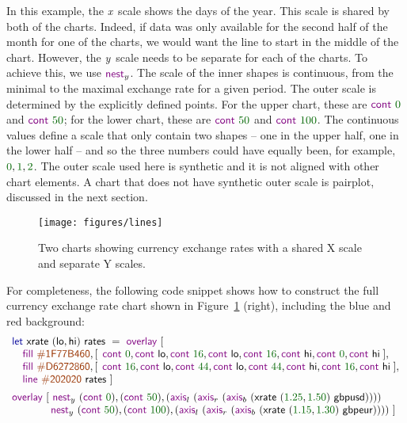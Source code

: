 \documentclass{jfp}
\newcommand{\X}{\emph{x}\ }
\newcommand{\Y}{\emph{y}\ }
\newcommand{\num}[1]{\textcolor{numclr}{#1}}
\newcommand{\strf}[1]{\textnormal{\textcolor{strclr}{\sffamily #1}}}
\newcommand{\ident}[1]{\textnormal{\textcolor{idclr}{\sffamily #1}}}
\newcommand{\kvd}[1]{\textnormal{\textcolor{kvdclr}{\sffamily #1}}}
\newcommand{\fkvd}[1]{\textnormal{\textcolor{fkvdclr}{\sffamily #1}}}
\begin{document}
\vspace{-0.5em}
\noindent
In this example, the \X scale shows the days of the year. This scale is shared by both of the charts.
Indeed, if data was only available for the second half of the month for one of the charts,
we would want the line to start in the middle of the chart. However, the \Y scale needs to be
separate for each of the charts. To achieve this, we use $\kvd{nest}_y$. The scale of the inner
shapes is continuous, from the minimal to the maximal exchange rate for a given period. The
outer scale is determined by the explicitly defined points. For the upper chart, these are
$\kvd{cont}~\num{0}$ and $\kvd{cont}~\num{50}$; for the lower chart, these are
$\kvd{cont}~\num{50}$ and $\kvd{cont}~\num{100}$. The continuous values define a scale that only
contain two shapes -- one in the upper half, one in the lower half -- and so the three numbers could
have equally been, for example, $\num{0},\num{1}, \num{2}$. The outer scale used here is
synthetic and it is not aligned with other chart elements. A chart that does not have synthetic
outer scale is pairplot, discussed in the next section.

\begin{figure}
\texttt{[image: figures/lines]}
\vspace{0.25em}
\caption{Two charts showing currency exchange rates with a shared X scale and separate Y scales.}
\label{fig:lines}
\end{figure}

For completeness, the following code snippet shows how to construct the full currency exchange
rate chart shown in Figure~\ref{fig:lines} (right), including the blue and red background:
%
\begin{equation*}
\begin{array}{l}
\fkvd{let}~\ident{xrate}~(\ident{lo}, \ident{hi})~\ident{rates}~=\kvd{overlay}~[\\
\quad \kvd{fill}~\strf{\#1F77B460}, [\;\,\kvd{cont}~\num{0}, \kvd{cont}~\ident{lo}, \kvd{cont}~\num{16}, \kvd{cont}~\ident{lo}, \kvd{cont}~\num{16}, \kvd{cont}~\ident{hi}, \kvd{cont}~\num{0}, \kvd{cont}~\ident{hi}\;],\\
\quad \kvd{fill}~\strf{\#D6272860}, [\;\,\kvd{cont}~\num{16}, \kvd{cont}~\ident{lo}, \kvd{cont}~\num{44}, \kvd{cont}~\ident{lo}, \kvd{cont}~\num{44}, \kvd{cont}~\ident{hi}, \kvd{cont}~\num{16}, \kvd{cont}~\ident{hi}\;],\\
\quad \kvd{line}~\strf{\#202020}~\ident{rates}~]\\[0.5em]
\kvd{overlay}~[~
\kvd{nest}_y~(\kvd{cont}~\num{0}),(\kvd{cont}~\num{50}), (\kvd{axis}_l~(\kvd{axis}_r~(\kvd{axis}_b~(\ident{xrate}~(\num{1.25}, \num{1.50})~\ident{gbpusd}))))\\
\hspace{3.68em} \kvd{nest}_y~(\kvd{cont}~\num{50}),(\kvd{cont}~\num{100}), (\kvd{axis}_l~(\kvd{axis}_r~(\kvd{axis}_b~(\ident{xrate}~(\num{1.15}, \num{1.30})~\ident{gbpeur}))))~]\\
\end{array}
\end{equation*}
\end{document}
